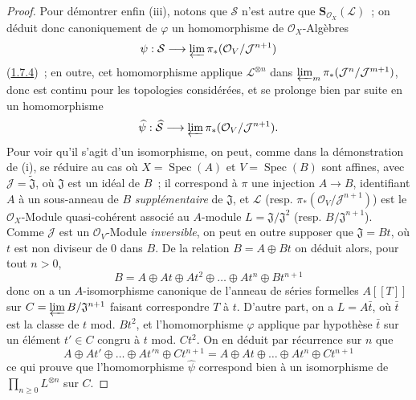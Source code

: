 \begin{proof}
Pour démontrer enfin (iii), notons que $\mathcal{S}$ n'est autre que
$\mathbf{S}_{\mathcal{O}_X}(\mathcal{L})$~; on déduit donc canoniquement de
$\varphi$ un homomorphisme de $\mathcal{O}_X$-Algèbres
\[
  \psi:\mathcal{S}\longrightarrow
  \varprojlim\pi_*(\mathcal{O}_V/\mathcal{J}^{n+1})
\]
(\hyperref[II.1.7.4-fr]{1.7.4})~; en outre, cet homomorphisme applique
$\mathcal{L}^{\otimes n}$ dans
$\varprojlim_m\pi_*(\mathcal{J}^n/\mathcal{J}^{m+1})$, donc est continu pour
les topologies considérées, et se prolonge bien par suite en un homomorphisme
\[
  \widehat{\psi}:\widehat{\mathcal{S}}\longrightarrow
  \varprojlim\pi_*(\mathcal{O}_V/\mathcal{J}^{n+1}).
\]
Pour voir qu'il s'agit d'un isomorphisme, on peut, comme dans la démonstration
de (i), se réduire au cas où $X=\operatorname{Spec}(A)$ et
$V=\operatorname{Spec}(B)$ sont affines, avec
$\mathcal{J}=\widetilde{\mathfrak{J}}$, où $\mathfrak{J}$ est un idéal de
$B$~; il correspond à $\pi$ une injection $A\to B$, identifiant $A$ à un
sous-anneau de $B$ \emph{supplémentaire} de $\mathfrak{J}$, et $\mathcal{L}$ (resp.
$\pi_*(\mathcal{O}_V/\mathcal{J}^{n+1})$) est le $\mathcal{O}_X$-Module
quasi-cohérent associé au $A$-module $L=\mathfrak{J}/\mathfrak{J}^2$ (resp.
$B/\mathfrak{J}^{n+1}$). Comme $\mathcal{J}$ est un
$\mathcal{O}_V$-Module \emph{inversible}, on peut en outre supposer que
$\mathfrak{J}=Bt$, où $t$ est non diviseur de 0 dans $B$. De la relation
$B=A\oplus Bt$ on déduit alors, pour tout $n>0$,
\[
  B=A\oplus At\oplus At^2\oplus\ldots\oplus At^n\oplus Bt^{n+1}
\]
donc on a un $A$-isomorphisme canonique de l'anneau de séries formelles
$A[[T]]$ sur $C=\varprojlim B/\mathfrak{J}^{n+1}$ faisant correspondre $T$ à
$t$. D'autre part, on a $L=A\bar t$, où $\bar t$ est la classe de $t$
mod. $Bt^2$, et l'homomorphisme $\varphi$ applique par hypothèse $\bar t$ sur
un élément $t'\in C$ congru à $t$ mod. $Ct^2$. On en déduit par récurrence
sur $n$ que
\[
  A\oplus At'\oplus\ldots\oplus At'{}^n\oplus Ct^{n+1}
  =A\oplus At\oplus\ldots\oplus At^n\oplus Ct^{n+1}
\]
ce qui prouve que l'homomorphisme $\widehat{\psi}$ correspond bien à un
isomorphisme de $\prod_{n\geqslant0}L^{\otimes n}$ sur $C$.
\end{proof}

